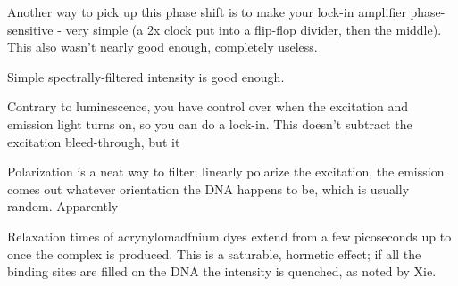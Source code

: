\documentclass[paper.tex]{subfiles}
\begin{document}
Another way to pick up this phase shift is to make your lock-in amplifier phase-sensitive - very simple (a 2x clock put into a flip-flop divider, then the middle). This also wasn’t nearly good enough, completely useless. 

Simple spectrally-filtered intensity is good enough.

Contrary to luminescence, you have control over when the excitation and emission light turns on, so you can do a lock-in. This doesn’t subtract the excitation bleed-through, but it 

Polarization is a neat way to filter; linearly polarize the excitation, the emission comes out whatever orientation the DNA happens to be, which is usually random. Apparently

Relaxation times of acrynylomadfnium dyes extend from a few picoseconds up to once the complex is produced. This is a saturable, hormetic effect; if all the binding sites are filled on the DNA the intensity is quenched, as noted by Xie. 
\end{document}
